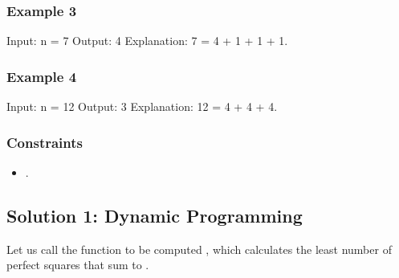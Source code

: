 \documentclass[letterpaper,12pt,english]{book}
\begin{document}
\subsubsection{Example 3}
\label{\detokenize{Mathematics/09_MTH_279_Perfect_Squares:example-3}}
\begin{sphinxVerbatim}[commandchars=\\\{\}]
Input: n = 7
Output: 4
Explanation: 7 = 4 + 1 + 1 + 1.
\end{sphinxVerbatim}


\subsubsection{Example 4}
\label{\detokenize{Mathematics/09_MTH_279_Perfect_Squares:example-4}}
\begin{sphinxVerbatim}[commandchars=\\\{\}]
Input: n = 12
Output: 3
Explanation: 12 = 4 + 4 + 4.
\end{sphinxVerbatim}


\subsubsection{Constraints}
\label{\detokenize{Mathematics/09_MTH_279_Perfect_Squares:constraints}}\begin{itemize}
\item {} 
\sphinxAtStartPar
{}.

\end{itemize}


\subsection{Solution 1: Dynamic Programming}
\label{\detokenize{Mathematics/09_MTH_279_Perfect_Squares:solution-1-dynamic-programming}}
\sphinxAtStartPar
Let us call the function to be computed , which calculates the least number of perfect squares that sum to .
\end{document}
